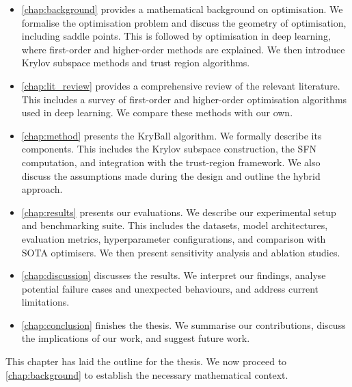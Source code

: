 \begin{itemize}
    \item \cref{chap:background} provides a mathematical background on optimisation. We formalise the optimisation problem and discuss the geometry of optimisation, including saddle points. This is followed by optimisation in deep learning, where first-order and higher-order methods are explained. We then introduce Krylov subspace methods and trust region algorithms.
    \item \cref{chap:lit_review} provides a comprehensive review of the relevant literature. This includes a survey of first-order and higher-order optimisation algorithms used in deep learning. We compare these methods with our own.
    \item \cref{chap:method} presents the KryBall algorithm. We formally describe its components. This includes the Krylov subspace construction, the SFN computation, and integration with the trust-region framework. We also discuss the assumptions made during the design and outline the hybrid approach.
    \item \cref{chap:results} presents our evaluations. We describe our experimental setup and benchmarking suite. This includes the datasets, model architectures, evaluation metrics, hyperparameter configurations, and comparison with SOTA optimisers. We then present sensitivity analysis and ablation studies.
    \item \cref{chap:discussion} discusses the results. We interpret our findings, analyse potential failure cases and unexpected behaviours, and address current limitations. 
    \item \cref{chap:conclusion} finishes the thesis. We summarise our contributions, discuss the implications of our work, and suggest future work.
\end{itemize}

This chapter has laid the outline for the thesis. We now proceed to \cref{chap:background} to establish the necessary mathematical context.